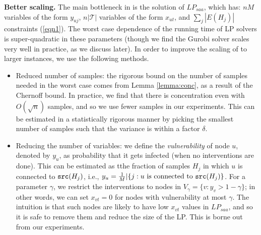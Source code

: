 \noindent
\textbf{Better scaling.}
The main bottleneck in \algo{} is the solution of $LP_{saa}$, which has: 
$nM$ variables of the form $y_{uj}$, $n|\mathcal{T}|$ variables of the form $x_{ut}$,
and $\sum_j |E(H_j)|$ constraints (\ref{eqn1}).
The worst case dependence of the running time of LP solvers is super-quadratic in these parameters
(though we find the Gurobi solver scales very well in practice, as we discuss later).
In order to improve the scaling of \algo{} to larger instances, we use the following methods.
\begin{itemize}
\item
Reduced number of samples: the rigorous bound on the number of samples needed in the worst case comes
from Lemma \ref{lemma:conc}, as a result of the Chernoff bound.
In practice, we find that there is concentration even with $O(\sqrt{n})$ samples, and so we
use fewer samples in our experiments. This can be estimated in a statistically rigorous manner by 
picking the smallest number of samples such that the variance is within a factor $\delta$.
\item
Reducing the number of variables: 
we define the \emph{vulnerability} of node $u$, denoted by $y_u$, as probability that it gets infected
(when no interventions are done).
This can be estimated as tthe fraction of samples $H_j$ in which $u$ is connected to $\texttt{src}(H_j)$,
i.e., $y_u=\frac{1}{M}|\{j: \mbox{$u$ is connected to $\texttt{src}(H_j)$}\}$.
For a parameter $\gamma$, we restrict the interventions to nodes in $V_{\gamma}=\{v: y_v > 1-\gamma\}$;
in other words, we can set $x_{vt}=0$ for nodes with vulnerability at most $\gamma$.
The intuition is that such nodes are likely to have low $x_{vt}$ values in $LP_{saa}$,
and so it is safe to remove them and reduce the size of the LP. This is borne out from our experiments.
\end{itemize}
